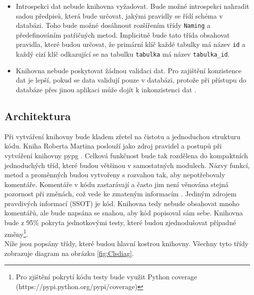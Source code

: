 \documentclass[ing,male,java,dept456]{diploma}						%
\begin{document}
\begin{itemize}
\item Introspekci dat nebude knihovna vyžadovat. Bude možné introspekci nahradit sadou předpisů, která bude určovat, jakými pravidly se řídí schéma v databázi. Toho bude možné dosáhnout rozšířením třídy \lstinline[style=inlinepython]|Naming| a předefinováním patřičných metod. Implicitně bude tato třída obsahovat pravidla, které budou určovat, že primární klíč každé tabulky má název \lstinline[style=inlinepython]|id| a každý cizí klíč odkazující se na tabulku \lstinline[style=inlinepython]|tabulka| má název \lstinline[style=inlinepython]|tabulka_id|. \\
\item Knihovna nebude poskytovat žádnou validaci dat. Pro zajištění konzistence dat je lepší, pokud se data validují pouze v databázi, protože při přístupu do databáze přes jinou aplikaci může dojít k inkonzistenci dat \cite{notorm-why}. \\
\end{itemize}

\subsection{Architektura}

Při vytváření knihovny bude kladem zřetel na čistotu a jednoduchou strukturu kódu. Kniha Roberta Martina poslouží jako zdroj pravidel a postupů při vytváření knihovny pypg \cite{cleancode}. Celková funkčnost bude tak rozdělena do kompaktních jednoduchých tříd, které budou většinou v samostatných modulech. Názvy funkcí, metod a proměnných budou vytvořeny s rozvahou tak, aby nepotřebovaly komentáře. Komentáře v kódu zastarávají a často jim není věnována stejná pozornost při změnách, což vede ke zmateným informacím  \cite{cleancode}. Jediným zdrojem pravdivých informací (SSOT) je kód. Knihovna tedy nebude obsahovat mnoho komentářů, ale bude napsána se snahou, aby kód popisoval sám sebe. Knihovna bude z 95\% pokryta jednotkovými testy, které budou zjednodušovat případné změny\footnote{Pro zjištění pokrytí kódu testy bude využit Python coverage (https://pypi.python.org/pypi/coverage)}. \\
Níže jsou popsány třídy, které budou hlavní kostrou knihovny. Všechny tyto třídy zobrazuje diagram na obrázku \ref{fig:Clsdiag}.
\end{document}
